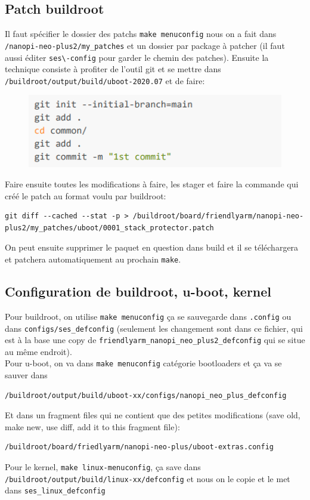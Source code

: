 \subsection{Patch buildroot}
Il faut spécifier le dossier des patchs \verb!make menuconfig! nous on a fait dans \verb!/nanopi-neo-plus2/my_patches! et un dossier par package à patcher (il faut aussi éditer \verb!ses\-config! pour garder le chemin des patches). Ensuite la technique consiste à profiter de l'outil git et se mettre dans \verb!/buildroot/output/build/uboot-2020.07! et de faire:
\begin{figure}[H]
\centering
\includegraphics[width=0.9\columnwidth]{Figures/buildroot_03.png}
\end{figure}
Faire ensuite toutes les modifications à faire, les stager et faire la commande qui créé le patch au format voulu par buildroot:
\begin{Verbatim}[breaklines=true, breakanywhere=true]
git diff --cached --stat -p > /buildroot/board/friendlyarm/nanopi-neo-plus2/my_patches/uboot/0001_stack_protector.patch
\end{Verbatim}
On peut ensuite supprimer le paquet en question dans build et il se téléchargera et patchera automatiquement au prochain \verb!make!.
\subsection{Configuration de buildroot, u-boot, kernel}
Pour buildroot, on utilise \verb!make menuconfig! ça se sauvegarde dans \verb!.config! ou dans \verb!configs/ses_defconfig! (seulement les changement sont dans ce fichier, qui est à la base une copy de \verb!friendlyarm_nanopi_neo_plus2_defconfig! qui se situe au même endroit).\\
Pour u-boot, on va dans \verb!make menuconfig! catégorie bootloaders et ça va se sauver dans 
\begin{Verbatim}[breaklines=true, breakanywhere=true]
/buildroot/output/build/uboot-xx/configs/nanopi_neo_plus_defconfig
\end{Verbatim}
Et dans un fragment files qui ne contient que des petites modifications (save old, make new, use diff, add it to this fragment file): 
\begin{Verbatim}[breaklines=true, breakanywhere=true]
/buildroot/board/friedlyarm/nanopi-neo-plus/uboot-extras.config
\end{Verbatim}
Pour le kernel, \verb!make linux-menuconfig!, ça save dans \verb!/buildroot/output/build/linux-xx/defconfig! et nous on le copie et le met dans \verb!ses_linux_defconfig!
